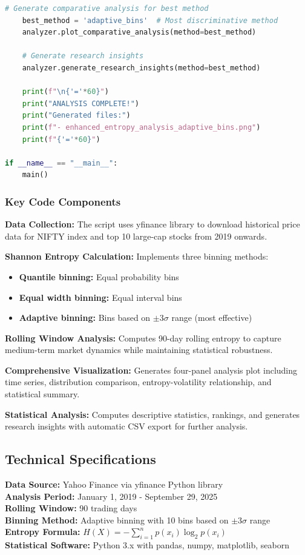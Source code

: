 \documentclass[12pt,a4paper]{article}
\begin{document}
\begin{lstlisting}[language=Python, caption=Research Insights and Main Execution, firstnumber=285]
    # Generate comparative analysis for best method
    best_method = 'adaptive_bins'  # Most discriminative method
    analyzer.plot_comparative_analysis(method=best_method)
    
    # Generate research insights
    analyzer.generate_research_insights(method=best_method)
    
    print(f"\n{'='*60}")
    print("ANALYSIS COMPLETE!")
    print("Generated files:")
    print(f"- enhanced_entropy_analysis_adaptive_bins.png")
    print(f"{'='*60}")

if __name__ == "__main__":
    main()
\end{lstlisting}

\subsubsection{Key Code Components}

\textbf{Data Collection:} The script uses yfinance library to download historical price data for NIFTY index and top 10 large-cap stocks from 2019 onwards.

\textbf{Shannon Entropy Calculation:} Implements three binning methods:
\begin{itemize}
    \item \textbf{Quantile binning:} Equal probability bins
    \item \textbf{Equal width binning:} Equal interval bins
    \item \textbf{Adaptive binning:} Bins based on $\pm 3\sigma$ range (most effective)
\end{itemize}

\textbf{Rolling Window Analysis:} Computes 90-day rolling entropy to capture medium-term market dynamics while maintaining statistical robustness.

\textbf{Comprehensive Visualization:} Generates four-panel analysis plot including time series, distribution comparison, entropy-volatility relationship, and statistical summary.

\textbf{Statistical Analysis:} Computes descriptive statistics, rankings, and generates research insights with automatic CSV export for further analysis.

\subsection{Technical Specifications}

\textbf{Data Source:} Yahoo Finance via yfinance Python library \\
\textbf{Analysis Period:} January 1, 2019 - September 29, 2025 \\
\textbf{Rolling Window:} 90 trading days \\
\textbf{Binning Method:} Adaptive binning with 10 bins based on $\pm 3\sigma$ range \\
\textbf{Entropy Formula:} $H(X) = -\sum_{i=1}^{n} p(x_i) \log_2 p(x_i)$ \\
\textbf{Statistical Software:} Python 3.x with pandas, numpy, matplotlib, seaborn
\end{document}
